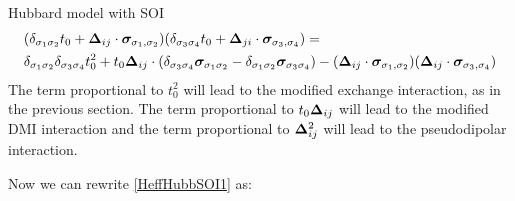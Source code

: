 \begin{section}{Hubbard model with SOI}
\begin{align*}
&(\delta_{\sigma_1 \sigma_2}t_0+\boldsymbol{\Delta}_{ij} \cdot\boldsymbol{\sigma}_{\sigma_1, \sigma_2}) (\delta_{\sigma_3 \sigma_4}t_0+\boldsymbol{\Delta}_{ji}\cdot \boldsymbol{\sigma}_{\sigma_3, \sigma_4}) = \\ 
&\delta_{\sigma_1 \sigma_2}\delta_{\sigma_3 \sigma_4}t_0^2 + t_0\boldsymbol{\Delta}_{ij}\cdot(\delta_{\sigma_3 \sigma_4} \boldsymbol{\sigma}_{\sigma_1 \sigma_2} - \delta_{\sigma_1 \sigma_2} \boldsymbol{\sigma}_{\sigma_3 \sigma_4}) - (\boldsymbol{\Delta}_{ij}\cdot\boldsymbol{\sigma}_{\sigma_1, \sigma_2})(\boldsymbol{\Delta}_{ij}\cdot\boldsymbol{\sigma}_{\sigma_3, \sigma_4})
\end{align*}
The term proportional to $t_0^2$ will lead to the modified exchange interaction, as in the previous section. The term proportional to $t_0\boldsymbol{\Delta}_{ij}$ will lead to the modified DMI interaction and the term proportional to $\boldsymbol{\Delta}_{ij}^2$ will lead to the pseudodipolar interaction.

Now we can rewrite \ref{HeffHubbSOI1} as:


\end{section}
